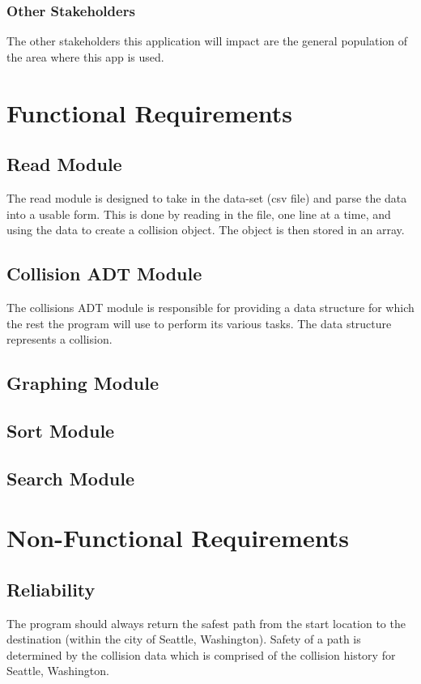 \documentclass[12pt]{article}
\begin{document}
    \subsubsection{Other Stakeholders}
    The other stakeholders this application will impact are the general population of the area where this app is used.

\section{Functional Requirements}
\subsection{Read Module}
The read module is designed to take in the data-set (csv file) and parse the data into a usable form. This is done by reading in the file, one line at a time, and using the data to create a collision object. The object is then stored in an array.

\subsection{Collision ADT Module}
The collisions ADT module is responsible for providing a data structure for which the rest the program will use to perform its various tasks. The data structure represents a collision.

\subsection{Graphing Module}


\subsection{Sort Module}


\subsection{Search Module}


\section{Non-Functional Requirements}
\subsection{Reliability}
The program should always return the safest path from the start location to the destination (within the city of Seattle, Washington). Safety of a path is determined by the collision data which is comprised of the collision history for Seattle, Washington.
\end{document}
